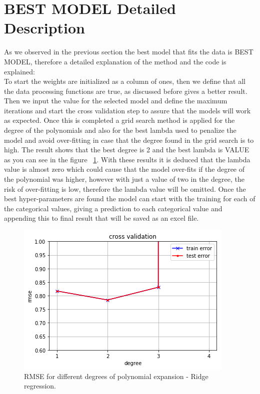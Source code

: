 \documentclass[10pt,conference,compsocconf]{IEEEtran}
\begin{document}
\section{BEST MODEL Detailed Description}
As we observed in the previous section the best model that fits 
the data is BEST MODEL, therefore a detailed explanation of the 
method and the code is explained:\\
To start the weights are initialized as a column of ones, then we define 
that all the data processing functions are true, as discussed before gives
a better result. Then we input the value for the selected model and define
the maximum iterations and start the cross validation step to assure that
the models will work as expected. Once this is completed a grid search
method is applied for the degree of the polynomials and also for the best
lambda used to penalize the model and avoid over-fitting in case that the 
degree found in the grid search is to high. The result shows that the best degree
is 2  and the best lambda is VALUE as you can see in the figure ~\ref{fig:best_degree}. 
With these results it is deduced that the lambda value is almost zero
which could cause that the model over-fits if the degree of the polynomial was
higher, however with just a value of two in the degree, the risk of over-fitting is
low, therefore the lambda value will be omitted. 
Once the best hyper-parameters are found the model can start with the training
for each of the categorical values, giving a prediction to each categorical value
and appending this to final result that will be saved as an excel file.



\begin{figure}[h]
  \centering
  \includegraphics[width=\columnwidth]{cross_validation_degree}
  \caption{RMSE for different degrees of polynomial expansion - Ridge regression.}
  \vspace{-3mm}
  \label{fig:best_degree}
\end{figure}
\end{document}
